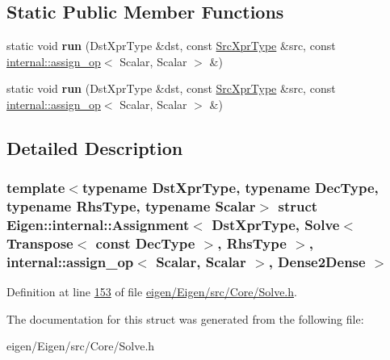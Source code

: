 \subsection*{Static Public Member Functions}
\begin{DoxyCompactItemize}
\item 
\mbox{\label{struct_eigen_1_1internal_1_1_assignment_3_01_dst_xpr_type_00_01_solve_3_01_transpose_3_01const_002733ef61eadb9652bc6bc1dd0938391_a8a9a57d354125ef97f90e7c91a3f9b29}} 
static void {\bfseries run} (Dst\+Xpr\+Type \&dst, const \hyperlink{group___core___module_class_eigen_1_1_solve}{Src\+Xpr\+Type} \&src, const \hyperlink{struct_eigen_1_1internal_1_1assign__op}{internal\+::assign\+\_\+op}$<$ Scalar, Scalar $>$ \&)
\item 
\mbox{\label{struct_eigen_1_1internal_1_1_assignment_3_01_dst_xpr_type_00_01_solve_3_01_transpose_3_01const_002733ef61eadb9652bc6bc1dd0938391_a8a9a57d354125ef97f90e7c91a3f9b29}} 
static void {\bfseries run} (Dst\+Xpr\+Type \&dst, const \hyperlink{group___core___module_class_eigen_1_1_solve}{Src\+Xpr\+Type} \&src, const \hyperlink{struct_eigen_1_1internal_1_1assign__op}{internal\+::assign\+\_\+op}$<$ Scalar, Scalar $>$ \&)
\end{DoxyCompactItemize}


\subsection{Detailed Description}
\subsubsection*{template$<$typename Dst\+Xpr\+Type, typename Dec\+Type, typename Rhs\+Type, typename Scalar$>$\newline
struct Eigen\+::internal\+::\+Assignment$<$ Dst\+Xpr\+Type, Solve$<$ Transpose$<$ const Dec\+Type $>$, Rhs\+Type $>$, internal\+::assign\+\_\+op$<$ Scalar, Scalar $>$, Dense2\+Dense $>$}



Definition at line \hyperlink{eigen_2_eigen_2src_2_core_2_solve_8h_source_l00153}{153} of file \hyperlink{eigen_2_eigen_2src_2_core_2_solve_8h_source}{eigen/\+Eigen/src/\+Core/\+Solve.\+h}.



The documentation for this struct was generated from the following file\+:\begin{DoxyCompactItemize}
\item 
eigen/\+Eigen/src/\+Core/\+Solve.\+h\end{DoxyCompactItemize}
